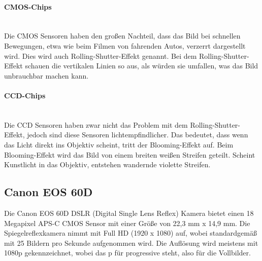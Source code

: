\paragraph{CMOS-Chips}
\leavevmode \\
Die CMOS Sensoren haben den großen Nachteil, dass das Bild bei schnellen Bewegungen, etwa wie beim Filmen von fahrenden Autos, verzerrt dargestellt wird. Dies wird auch Rolling-Shutter-Effekt genannt. Bei dem Rolling-Shutter-Effekt schauen die vertikalen Linien so aus, als würden sie umfallen, was das Bild unbrauchbar machen kann.\citep{sensor}
\paragraph{CCD-Chips}
\leavevmode \\
Die CCD Sensoren haben zwar nicht das Problem mit dem Rolling-Shutter-Effekt, jedoch sind diese Sensoren lichtempfindlicher. Das bedeutet, dass wenn das Licht direkt ins Objektiv scheint, tritt der Blooming-Effekt auf. Beim Blooming-Effekt wird das Bild von einem breiten weißen Streifen geteilt. Scheint Kunstlicht in das Objektiv, entstehen wandernde violette Streifen.\citep{ccd}
\subsection{Canon EOS 60D}
Die Canon EOS 60D DSLR (Digital Single Lens Reflex) Kamera bietet einen 18 Megapixel APS-C CMOS Sensor mit einer Größe von 22,3 mm x 14,9 mm. Die Spiegelreflexkamera nimmt mit Full HD (1920 x 1080) auf, wobei standardgemäß mit 25 Bildern pro Sekunde aufgenommen wird. Die Auflösung wird meistens mit 1080p gekennzeichnet, wobei das p für progressive steht, also für die Vollbilder.\citep{canon60}\citep{canon60Zwei}
